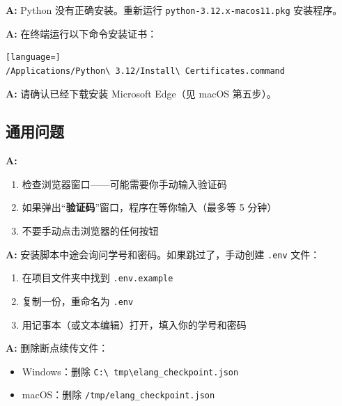 \documentclass[12pt,a4paper]{ctexart}
\begin{document}
\begin{tipbox}
  \textbf{A:} Python 没有正确安装。重新运行
  \texttt{python-3.12.x-macos11.pkg} 安装程序。
\end{tipbox}

\begin{tipbox}
  \textbf{A:} 在终端运行以下命令安装证书：
    \begin{lstlisting}[language=]
/Applications/Python\ 3.12/Install\ Certificates.command
\end{lstlisting}
\end{tipbox}

\begin{tipbox}
  \textbf{A:} 请确认已经下载安装 Microsoft Edge（见 macOS 第五步）。
\end{tipbox}

\subsection{通用问题}

\begin{tipbox}
  \textbf{A:}
  \begin{enumerate}[nosep]
    \item 检查浏览器窗口——可能需要你手动输入验证码
    \item 如果弹出``\textbf{验证码}''窗口，程序在等你输入（最多等 5 分钟）
    \item 不要手动点击浏览器的任何按钮
  \end{enumerate}
\end{tipbox}

\begin{tipbox}
  \textbf{A:} 安装脚本中途会询问学号和密码。如果跳过了，手动创建 \texttt{.env} 文件：
  \begin{enumerate}[nosep]
    \item 在项目文件夹中找到 \texttt{.env.example}
    \item 复制一份，重命名为 \texttt{.env}
    \item 用记事本（或文本编辑）打开，填入你的学号和密码
  \end{enumerate}
\end{tipbox}

\begin{tipbox}
  \textbf{A:} 删除断点续传文件：
  \begin{itemize}[nosep]
    \item Windows：删除 \texttt{C:\textbackslash
      tmp\textbackslash elang\_checkpoint.json}
    \item macOS：删除 \texttt{/tmp/elang\_checkpoint.json}
  \end{itemize}
\end{tipbox}
\end{document}
